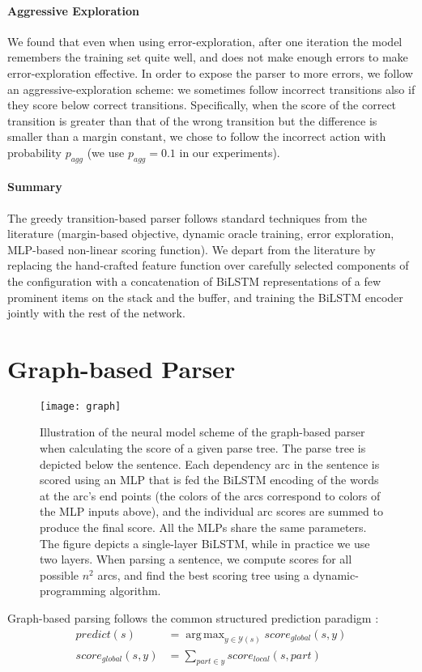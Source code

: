\documentclass[11pt]{article}
\DeclareMathOperator*{\argmax}{arg\,max}
\begin{document}
\paragraph{Aggressive Exploration} We found that even when using error-exploration, after one iteration the model
remembers the training set quite well, and does not make enough errors to make
error-exploration effective.  In order to expose the parser to more errors, we 
follow an aggressive-exploration scheme: we sometimes follow incorrect transitions also if
they score below correct transitions.  Specifically, when the score of the correct
transition is greater than that of the wrong transition but the difference is smaller
than a margin constant, we chose to follow the incorrect action with probability
$p_{agg}$ (we use $p_{agg}=0.1$ in our experiments).

\paragraph{Summary}
The greedy transition-based parser follows standard techniques from the
literature (margin-based objective, dynamic oracle training, error exploration,
MLP-based non-linear scoring function).
We depart from the literature by replacing the hand-crafted feature function
over carefully selected components of the configuration with a concatenation of
BiLSTM representations of a few prominent items on the stack and the
buffer, and training the \mbox{BiLSTM} encoder jointly with the rest of the network. 

\section{Graph-based Parser}
\begin{figure*}
\begin{center}
\texttt{[image: graph]}
\end{center}
\vspace*{-2em}
\caption{\small Illustration of the neural model scheme of the graph-based parser when calculating the score of a given parse tree.
The parse tree is depicted below the sentence. Each dependency arc in the sentence is scored using an MLP that is fed the \mbox{BiLSTM} encoding of the words at the arc's end points (the colors of the arcs correspond to colors of the MLP inputs above), and the individual arc scores are summed to produce the final score. All the MLPs share the same parameters. The figure depicts a single-layer BiLSTM, while in practice we use two layers. When parsing a sentence, we compute scores for all possible $n^2$ arcs, and find the best scoring tree using a dynamic-programming algorithm.}
\label{fig:firstorder}
\end{figure*}
\label{sec:mst}
Graph-based parsing follows the common structured prediction paradigm
\cite{taskar2005learning,mst}:
\begin{align*}
    predict(s) &= \argmax_{y \in \mathcal{Y}(s)} score_{global}(s,y) \\
    score_{global}(s,y) &= \sum_{part \in y} score_{local}(s, part) \end{align*}
\end{document}
